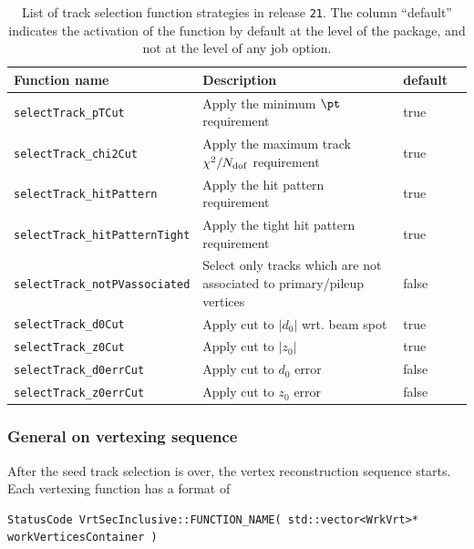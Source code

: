 \begin{table}[t]
\caption{List of track selection function strategies in release {\tt 21}. The column ``default'' indicates the activation of the function by default at the level of the package, and not at the level of any job option.}
\centering
\begin{scriptsize}
\begin{tabular}{llll}
\hline
\hline
Function name & Description& default\\
\hline
{\tt selectTrack\_pTCut} & Apply the minimum $\pt$ requirement & true\\
{\tt selectTrack\_chi2Cut} & Apply the maximum track $\chi^{2}/N_{\rm dof}$ requirement & true\\
{\tt selectTrack\_hitPattern} & Apply the hit pattern requirement & true\\
{\tt selectTrack\_hitPatternTight} & Apply the tight hit pattern requirement & true\\
{\tt selectTrack\_notPVassociated} & Select only tracks which are not associated to primary/pileup vertices & false \\
{\tt selectTrack\_d0Cut} & Apply cut to $|d_{0}|$ wrt. beam spot & true\\
{\tt selectTrack\_z0Cut} & Apply cut to $|z_{0}|$& true\\
{\tt selectTrack\_d0errCut} & Apply cut to $d_{0}$ error & false\\
{\tt selectTrack\_z0errCut} & Apply cut to $z_{0}$ error & false\\
\hline
\hline
\end{tabular}
\end{scriptsize}
\label{tbl:trackSelection}
\end{table}%

\subsubsection{General on vertexing sequence}
After the seed track selection is over, the vertex reconstruction sequence starts. Each vertexing function has a format of 

\begin{scriptsize}
\begin{verbatim}
StatusCode VrtSecInclusive::FUNCTION_NAME( std::vector<WrkVrt>* workVerticesContainer )
\end{verbatim}
\end{scriptsize}

